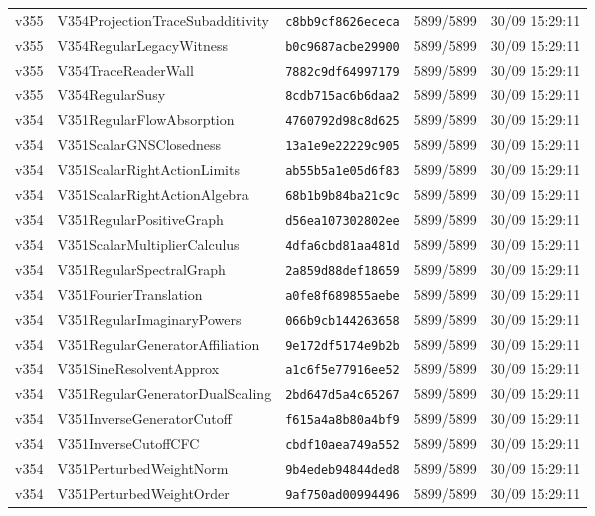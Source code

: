 \documentclass[11pt]{article}
\theoremstyle{definition}\newtheorem{deriv}{Derivation}
\begin{document}
{\begin{longtable}{@{}lllll@{}}
v355 & V354ProjectionTraceSubadditivity & \texttt{c8bb9cf8626ececa} & 5899/5899 & 30/09 15:29:11 \\
v355 & V354RegularLegacyWitness & \texttt{b0c9687acbe29900} & 5899/5899 & 30/09 15:29:11 \\
v355 & V354TraceReaderWall & \texttt{7882c9df64997179} & 5899/5899 & 30/09 15:29:11 \\
v355 & V354RegularSusy & \texttt{8cdb715ac6b6daa2} & 5899/5899 & 30/09 15:29:11 \\
v354 & V351RegularFlowAbsorption & \texttt{4760792d98c8d625} & 5899/5899 & 30/09 15:29:11 \\
v354 & V351ScalarGNSClosedness & \texttt{13a1e9e22229c905} & 5899/5899 & 30/09 15:29:11 \\
v354 & V351ScalarRightActionLimits & \texttt{ab55b5a1e05d6f83} & 5899/5899 & 30/09 15:29:11 \\
v354 & V351ScalarRightActionAlgebra & \texttt{68b1b9b84ba21c9c} & 5899/5899 & 30/09 15:29:11 \\
v354 & V351RegularPositiveGraph & \texttt{d56ea107302802ee} & 5899/5899 & 30/09 15:29:11 \\
v354 & V351ScalarMultiplierCalculus & \texttt{4dfa6cbd81aa481d} & 5899/5899 & 30/09 15:29:11 \\
v354 & V351RegularSpectralGraph & \texttt{2a859d88def18659} & 5899/5899 & 30/09 15:29:11 \\
v354 & V351FourierTranslation & \texttt{a0fe8f689855aebe} & 5899/5899 & 30/09 15:29:11 \\
v354 & V351RegularImaginaryPowers & \texttt{066b9cb144263658} & 5899/5899 & 30/09 15:29:11 \\
v354 & V351RegularGeneratorAffiliation & \texttt{9e172df5174e9b2b} & 5899/5899 & 30/09 15:29:11 \\
v354 & V351SineResolventApprox & \texttt{a1c6f5e77916ee52} & 5899/5899 & 30/09 15:29:11 \\
v354 & V351RegularGeneratorDualScaling & \texttt{2bd647d5a4c65267} & 5899/5899 & 30/09 15:29:11 \\
v354 & V351InverseGeneratorCutoff & \texttt{f615a4a8b80a4bf9} & 5899/5899 & 30/09 15:29:11 \\
v354 & V351InverseCutoffCFC & \texttt{cbdf10aea749a552} & 5899/5899 & 30/09 15:29:11 \\
v354 & V351PerturbedWeightNorm & \texttt{9b4edeb94844ded8} & 5899/5899 & 30/09 15:29:11 \\
v354 & V351PerturbedWeightOrder & \texttt{9af750ad00994496} & 5899/5899 & 30/09 15:29:11 \\

\end{longtable}}
\end{document}
